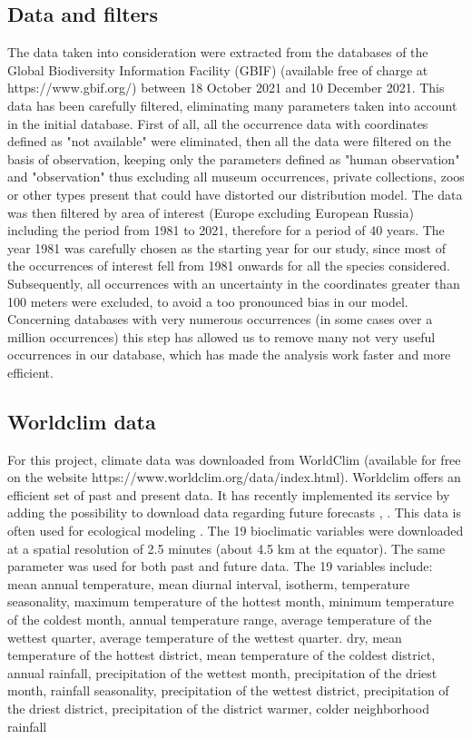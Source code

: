 \documentclass[12pt,a4paper]{article}
\begin{document}
\subsection{Data and filters}
The data taken into consideration were extracted from the databases of the Global Biodiversity Information Facility (GBIF) (available free of charge at https://www.gbif.org/) between 18 October 2021 and 10 December 2021.
This data has been carefully filtered, eliminating many parameters taken into account in the initial database.
First of all, all the occurrence data with coordinates defined as "not available" were eliminated, then all the data were filtered on the basis of observation, keeping only the parameters defined as "human observation" and "observation" thus excluding all museum occurrences, private collections, zoos or other types present that could have distorted our distribution model.
The data was then filtered by area of interest (Europe excluding European Russia) including the period from 1981 to 2021, therefore for a period of 40 years.
The year 1981 was carefully chosen as the starting year for our study, since most of the occurrences of interest fell from 1981 onwards for all the species considered.
Subsequently, all occurrences with an uncertainty in the coordinates greater than 100 meters were excluded, to avoid a too pronounced bias in our model.
Concerning databases with very numerous occurrences (in some cases over a million occurrences) this step has allowed us to remove many not very useful occurrences in our database, which has made the analysis work faster and more efficient.

\subsection{Worldclim data}

For this project, climate data was downloaded from WorldClim (available for free on the website https://www.worldclim.org/data/index.html).
Worldclim offers an efficient set of past and present data. It has recently implemented its service by adding the possibility to download data regarding future forecasts \citep{wc}, \citep{ey}. This data is often used for ecological modeling \citep{bcw}. 
The 19 bioclimatic variables were downloaded at a spatial resolution of 2.5 minutes (about 4.5 km at the equator). The same parameter was used for both past and future data.
The 19 variables include: mean annual temperature, mean diurnal interval, isotherm, temperature seasonality, maximum temperature of the hottest month, minimum temperature of the coldest month, annual temperature range, average temperature of the wettest quarter, average temperature of the wettest quarter. dry, mean temperature of the hottest district, mean temperature of the coldest district, annual rainfall, precipitation of the wettest month, precipitation of the driest month, rainfall seasonality, precipitation of the wettest district, precipitation of the driest district, precipitation of the district warmer, colder neighborhood rainfall 
\end{document}
